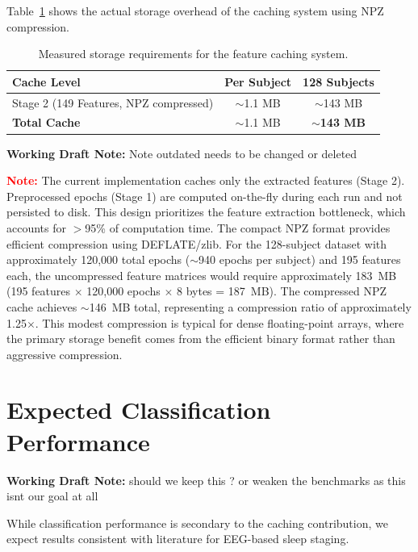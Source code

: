 \documentclass{imc-inf} %
\begin{document}
Table~\ref{tab:expected_storage} shows the actual storage overhead of the caching system using NPZ compression.

\begin{table}[ht]
\centering
\begin{tabular}{|l|c|c|}
\hline
\textbf{Cache Level} & \textbf{Per Subject} & \textbf{128 Subjects} \\
\hline
Stage 2 (149 Features, NPZ compressed) & $\sim$1.1 MB & $\sim$143 MB \\
\hline
\textbf{Total Cache} & $\sim$1.1 MB & \textbf{$\sim$143 MB} \\
\hline
\end{tabular}
\caption{Measured storage requirements for the feature caching system.}
\label{tab:expected_storage}
\end{table}



\begin{center}
\colorbox{yellow!20}{%
\begin{minipage}{0.9\textwidth}
\textbf{Working Draft Note:} 
Note outdated needs to be changed or deleted
\end{minipage}
}
\end{center}
\textcolor{red}{\textbf{Note:}} The current implementation caches only the extracted features (Stage 2). Preprocessed epochs (Stage 1) are computed on-the-fly during each run and not persisted to disk. This design prioritizes the feature extraction bottleneck, which accounts for $>$95\% of computation time. The compact NPZ format provides efficient compression using DEFLATE/zlib. For the 128-subject dataset with approximately 120,000 total epochs ($\sim$940 epochs per subject) and 195 features each, the uncompressed feature matrices would require approximately 183~MB (195 features $\times$ 120,000 epochs $\times$ 8 bytes = 187~MB). The compressed NPZ cache achieves $\sim$146~MB total, representing a compression ratio of approximately 1.25$\times$. This modest compression is typical for dense floating-point arrays, where the primary storage benefit comes from the efficient binary format rather than aggressive compression.

\section{Expected Classification Performance}


\begin{center}
\colorbox{yellow!20}{%
\begin{minipage}{0.9\textwidth}
\textbf{Working Draft Note:} 
should we keep this ? or weaken the benchmarks as this isnt our goal at all
\end{minipage}
}
\end{center}
While classification performance is secondary to the caching contribution, we expect results consistent with literature for EEG-based sleep staging.
\end{document}
